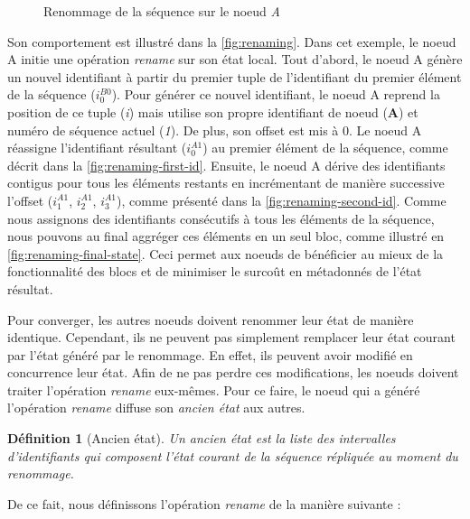 \documentclass[12pt]{thesul}
\newtheorem{definition}{Définition}
\newcommand{\trm}[1]{\mathit{#1}}
\newcommand{\id}[3]{$\trm{#1}^{\trm{#2}}_{\trm{#3}}$}
\begin{document}
\begin{figure}[t!]
{\begin{minipage}{\linewidth}
          \label{fig:renaming-final-state}
      \end{minipage}}
  \caption{Renommage de la séquence sur le noeud \emph{A}}
  \label{fig:renaming}
\end{figure}

Son comportement est illustré dans la \autoref{fig:renaming}.
Dans cet exemple, le noeud A initie une opération \emph{rename} sur son état local.
Tout d'abord, le noeud A génère un nouvel identifiant à partir du premier tuple de l'identifiant du premier élément de la séquence (\id{i}{B0}{0}).
Pour générer ce nouvel identifiant, le noeud A reprend la position de ce tuple (\emph{i}) mais utilise son propre identifiant de noeud (\textbf{A}) et numéro de séquence actuel (\emph{1}).
De plus, son offset est mis à 0.
Le noeud A réassigne l'identifiant résultant (\id{i}{A1}{0}) au premier élément de la séquence, comme décrit dans la \autoref{fig:renaming-first-id}.
Ensuite, le noeud A dérive des identifiants contigus pour tous les éléments restants en incrémentant de manière successive l'offset (\id{i}{A1}{1}, \id{i}{A1}{2}, \id{i}{A1}{3}), comme présenté dans la \autoref{fig:renaming-second-id}.
Comme nous assignons des identifiants consécutifs à tous les éléments de la séquence, nous pouvons au final aggréger ces éléments en un seul bloc, comme illustré en \autoref{fig:renaming-final-state}.
Ceci permet aux noeuds de bénéficier au mieux de la fonctionnalité des blocs et de minimiser le surcoût en métadonnés de l'état résultat.

Pour converger, les autres noeuds doivent renommer leur état de manière identique.
Cependant, ils ne peuvent pas simplement remplacer leur état courant par l'état généré par le renommage.
En effet, ils peuvent avoir modifié en concurrence leur état.
Afin de ne pas perdre ces modifications, les noeuds doivent traiter l'opération \emph{rename} eux-mêmes.
Pour ce faire, le noeud qui a généré l'opération \emph{rename} diffuse son \emph{ancien état} aux autres.

\begin{definition}[Ancien état]
  Un \emph{ancien état} est la liste des intervalles d'identifiants qui composent l'état courant de la séquence répliquée au moment du renommage.
\end{definition}

De ce fait, nous définissons l'opération \emph{rename} de la manière suivante :
\end{document}
